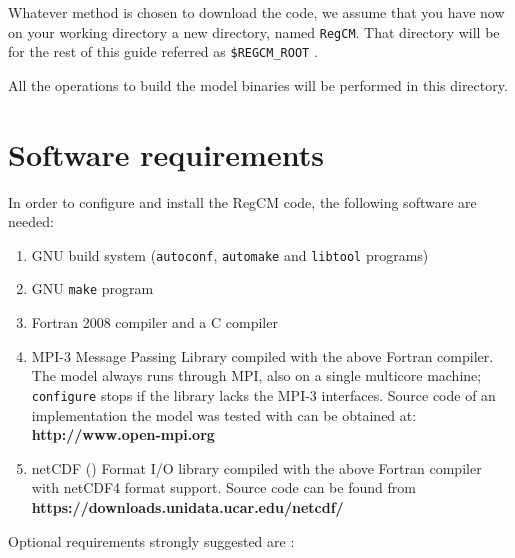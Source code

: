 
Whatever method is chosen to download the code, we assume that you have now
on your working directory a new directory, named \verb=RegCM=.
That directory will be for the rest of this guide referred as 
\verb=$REGCM_ROOT= .

All the operations to build the model binaries will be performed in this
directory.

\section{Software requirements}

In order to configure and install the RegCM code, the following software are
needed:

\begin{enumerate}
    \item GNU build system (\verb=autoconf=, \verb=automake= and
        \verb=libtool= programs)
    \item GNU \verb=make= program
    \item Fortran 2008 compiler and a C compiler
    \item MPI-3 Message Passing Library compiled with the above Fortran
     compiler. The model always runs through MPI, also on a single
     multicore machine; \verb=configure= stops if the library lacks the MPI-3
     interfaces. Source code of an implementation the model was tested with
     can be obtained at: \\
     {\bf http://www.open-mpi.org}
\item netCDF (\cite{Rew_90}) Format I/O library compiled with the above
  Fortran compiler with netCDF4 format support. Source code can be found from \\
  {\bf https://downloads.unidata.ucar.edu/netcdf/} \\
\end{enumerate}

Optional requirements strongly suggested are :

